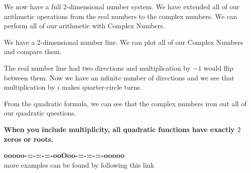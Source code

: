 \documentclass{ximera}
\begin{document}
We now have a full 2-dimensional number system.  We have extended all of our arithmetic operations from the real numbers to the complex numbers.  We can perform all of our arithmetic with Complex Numbers.



We have a 2-dimensional number line. We can plot all of our Complex Numbers and compare them.

The real number line had two directions and multiplication by $-1$ would flip between them.  Now we have an infinite number of directions and we see that multiplication by $i$ makes quarter-circle turns.

From the quadratic formula, we can see that the complex numbers iron out all of our quadratic questions.

\begin{center}
\textbf{\textcolor{red!70!black}{When you include multiplicity, all quadratic functions have exactly $2$ zeros or roots.}}
\end{center}


























\begin{center}
\textbf{\textcolor{green!50!black}{ooooo-=-=-=-ooOoo-=-=-=-ooooo}} \\

more examples can be found by following this link\\ 

\end{center}
\end{document}
